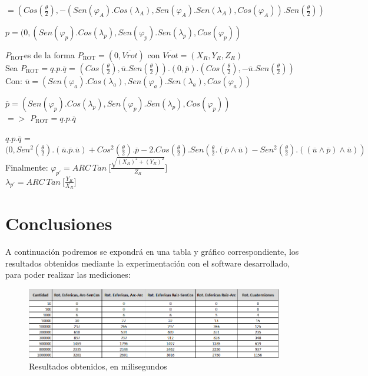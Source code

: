\documentclass[spanish]{article}
\begin{document}
\(= (Cos(\frac{\theta}{2}), - (Sen(\varphi_{A}).Cos(\lambda_{A}),Sen(\varphi_{A}).Sen(\lambda_{A}),Cos(\varphi_{A})).Sen(\frac{\theta}{2}))\)

\(p = (0,(Sen(\varphi_{p}).Cos(\lambda_{p}),Sen(\varphi_{p}).Sen(\lambda_{p}),Cos(\varphi_{p}))\)

\(P_{\text{ROT}}\)es de la forma \(P_{\text{ROT}} = (0,\overline{Vrot})\) con
\(\overline{Vrot}= (X_{R},Y_{R},Z_{R})\)\\


Sea \(P_{\text{ROT}} = q.p.\overline{q}\) = \((Cos(\frac{\theta}{2}), \overline{u}.Sen(\frac{\theta}{2}))\).\((0,\overline{p}) \).\( (Cos(\frac{\theta}{2}), -\overline{u}.Sen(\frac{\theta}{2}))\)\\

Con: 
\(\overline{u} = (Sen(\varphi_{a}).Cos(\lambda_{a}), Sen(\varphi_{a}).Sen(\lambda_{a}),Cos(\varphi_{a}))\)

\(\overline{p} = (Sen(\varphi_{p}).Cos(\lambda_{p}),Sen(\varphi_{p}).Sen(\lambda_{p}),Cos(\varphi_{p}))\)\\


\(=>\) \(P_{\text{ROT}} = q.p.\overline{q} \)

\(q.p.\overline{q}\) = \((0, Sen^2(\frac{\theta}{2}).(\overline{u}.\overline{p}.\overline{u}) + Cos^2(\frac{\theta}{2}).\overline{p} - 2.Cos(\frac{\theta}{2}).Sen(\frac{\theta}{2}.(\overline{p} \wedge \overline{u}) - Sen^2(\frac{\theta}{2}).((\overline{u}\wedge\overline{p})\wedge\overline{u})) \)\\


Finalmente: \(\varphi_{p'} = ARC\ Tan\ \lbrack\frac{\sqrt{(X_{R})^2+(Y_{R})^2}}{Z_{R}}\rbrack\)\\

\(\lambda_{p'} = ARC\ Tan\ \lbrack\frac{Y_{R}}{X_{R}}\rbrack\)
  
\clearpage  
\section{Conclusiones}

A continuación podremos se expondrá en una tabla y gráfico correspondiente, los resultados obtenidos mediante la experimentación con el software desarrollado, para poder realizar las mediciones:

\begin{figure}[H]
  \centering
    \includegraphics[scale=0.70]{result.png}
  \caption{Resultados obtenidos, en milisegundos}
  \label{fig:ejemplo}
\end{figure}\\
\end{document}
